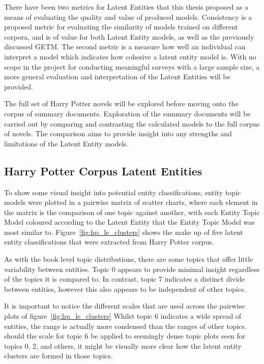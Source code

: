 \documentclass[10pt]{report}
\begin{document}
There have been two metrics for Latent Entities that this thesis proposed as a means of evaluating the quality and value of produced models. Consistency is a proposed metric for evaluating the similarity of models trained on different corpora, and is of value for both Latent Entity models, as well as the previously discussed GETM. The second metric is a measure how well an individual can interpret a model which indicates how cohesive a latent entity model is. With no scope in the project for conducting meaningful surveys with a large sample size, a more general evaluation and interpretation of the Latent Entities will be provided.

The full set of Harry Potter novels will be explored before moving onto the corpus of summary documents. Exploration of the summary documents will be carried out by comparing and contrasting the calculated models to the full corpus of novels. The comparison aims to provide insight into any strengths and limitations of the Latent Entity models.

\subsection{Harry Potter Corpus Latent Entities}
To show some visual insight into potential entity classifications, entity topic models were plotted in a pairwise matrix of scatter charts, where each element in the matrix is the comparison of one topic against another, with each Entity Topic Model coloured according to the Latent Entity that the Entity Topic Model was most similar to. Figure~\ref{fig:hp_le_clusters} shows the make up of five latent entity classifications that were extracted from Harry Potter corpus.

As with the book level topic distributions, there are some topics that offer little variability between entities. Topic 0 appears to provide minimal insight regardless of the topics it is compared to. In contrast, topic 7 indicates a distinct divide between entities, however this also appears to be independent of other topics.

It is important to notice the different scales that are used across the pairwise plots of figure~\ref{fig:hp_le_clusters} Whilst topic 6 indicates a wide spread of entities, the range is actually more condensed than the ranges of other topics. should the scale for topic 6 be applied to seemingly dense topic plots seen for topics 0, 2, and others, it might be visually more clear how the latent entity clusters are formed in those topics.
\end{document}
